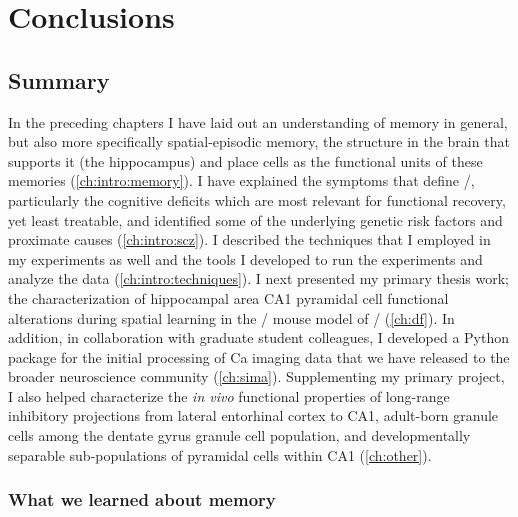 \acresetall
\chapter{Conclusions}
\label{ch:conclusions}

\section{Summary}
In the preceding chapters I have laid out an understanding of memory in general, but also more specifically spatial-episodic memory, the structure in the brain that supports it (the hippocampus) and place cells as the functional units of these memories (\autoref{ch:intro:memory}).
I have explained the symptoms that define \scz/, particularly the cognitive deficits which are most relevant for functional recovery, yet least treatable, and identified some of the underlying genetic risk factors and proximate causes (\autoref{ch:intro:scz}).
I described the techniques that I employed in my experiments as well and the tools I developed to run the experiments and analyze the data (\autoref{ch:intro:techniques}).
I next presented my primary thesis work; the characterization of hippocampal area CA1 pyramidal cell functional alterations during spatial learning in the \df/ mouse model of \scz/ (\autoref{ch:df}).
In addition, in collaboration with graduate student colleagues, I developed a Python package for the initial processing of Ca imaging data that we have released to the broader neuroscience community (\autoref{ch:sima}).
Supplementing my primary project, I also helped characterize the \emph{in vivo} functional properties of long-range inhibitory projections from lateral entorhinal cortex to CA1, adult-born granule cells among the dentate gyrus granule cell population, and developmentally separable sub-populations of pyramidal cells within CA1 (\autoref{ch:other}).

\subsection{What we learned about memory}

